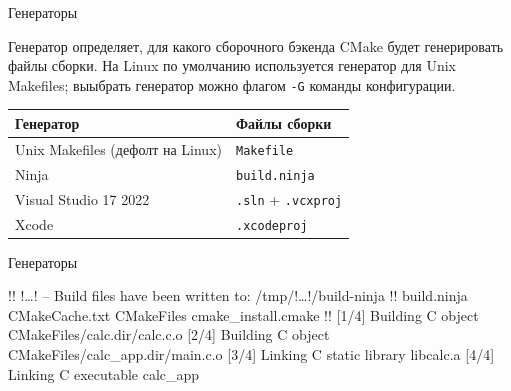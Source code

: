 \documentclass[compress, 8pt, aspectratio=169]{beamer}
\begin{document}
\begin{frame}[fragile]{Генераторы}

  Генератор определяет, для какого сборочного бэкенда CMake будет генерировать
  файлы сборки.
  На Linux по умолчанию используется генератор для Unix Makefiles\footnotemark{};
  выыбрать генератор можно флагом \texttt{-G} команды конфигурации.


  \bigbreak

  \begin{center}

    \renewcommand{\arraystretch}{1.4}

    \begin{tabular}{|p{5cm}|p{5cm}|}

      \hline

      \textbf{Генератор} & \textbf{Файлы сборки} \\

      \hline

      Unix Makefiles (дефолт на Linux) & \texttt{Makefile} \\

      \hline

      Ninja & \texttt{build.ninja} \\

      \hline

      Visual Studio 17 2022 & \texttt{.sln} + \texttt{.vcxproj} \\

      \hline

      Xcode & \texttt{.xcodeproj} \\

      \hline

    \end{tabular}

  \end{center}

\end{frame}

\begin{frame}[fragile]{Генераторы}

  \begin{terminalwindow}
!!
!\dots!
-- Build files have been written to: /tmp/!\dots!/build-ninja
!!
build.ninja
CMakeCache.txt
CMakeFiles
cmake_install.cmake
!!
[1/4] Building C object CMakeFiles/calc.dir/calc.c.o
[2/4] Building C object CMakeFiles/calc_app.dir/main.c.o
[3/4] Linking C static library libcalc.a
[4/4] Linking C executable calc_app
  \end{terminalwindow}

\end{frame}
\end{document}
